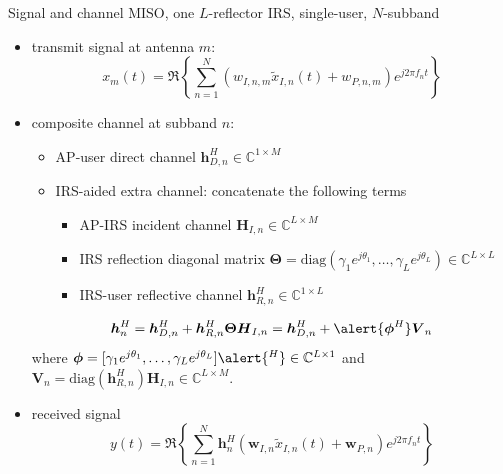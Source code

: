\documentclass[9pt]{beamer}
\begin{document}
\begin{frame}{Signal and channel}
    MISO, one $L$-reflector IRS, single-user, $N$-subband
    \begin{itemize}
        \item transmit signal at antenna $m$:
        \begin{equation}\label{eq:x_m}
            x_m(t)=\Re\left\{\sum_{n=1}^N\left({w_{I,n,m}\tilde{x}_{I,n}(t)}+w_{P,n,m}\right){e^{j2{\pi}{f_n}{t}}}\right\}
        \end{equation}
        \item composite channel at subband $n$:
        \begin{itemize}
            \item AP-user direct channel $\boldsymbol{h}_{D,n}^H \in \mathbb{C}^{1 \times M}$
            \item IRS-aided extra channel: concatenate the following terms
            \begin{itemize}
                \item AP-IRS incident channel $\boldsymbol{H}_{I,n} \in \mathbb{C}^{L \times M}$
                \item IRS reflection diagonal matrix $\boldsymbol{\Theta} = \mathrm{diag}(\gamma_1 e^{j \theta_1}, \dots, \gamma_L e^{j \theta_L}) \in \mathbb{C}^{L \times L}$
                \item IRS-user reflective channel $\boldsymbol{h}_{R,n}^H \in \mathbb{C}^{1 \times L}$
            \end{itemize}
        \end{itemize}
        \begin{equation}\label{eq:h_{n}}
            \boldsymbol{h}_{n}^H = \boldsymbol{h}_{D,n}^H + \boldsymbol{h}_{R,n}^H \boldsymbol{\Theta} \boldsymbol{H}_{I,n} = \boldsymbol{h}_{D,n}^H + \alert{\boldsymbol{\phi}^H} \boldsymbol{V}_{n}
        \end{equation}
        where $\boldsymbol{\phi}=[\gamma_1 e^{j \theta_1}, \dots, \gamma_L e^{j \theta_L}]\alert{^H} \in \mathbb{C}^{L \times 1}$ and $\boldsymbol{V}_{n}=\mathrm{diag}(\boldsymbol{h}_{R,n}^H)\boldsymbol{H}_{I,n} \in \mathbb{C}^{L \times M}$.
        \item received signal
        \begin{equation}
            y(t)=\Re\left\{\sum_{n=1}^N{\boldsymbol{h}_n^H}\left({\boldsymbol{w}_{I,n}\tilde{x}_{I,n}(t)}+\boldsymbol{w}_{P,n}\right){e^{j2{\pi}{f_n}{t}}}\right\}
        \end{equation}
    \end{itemize}
\end{frame}
\end{document}
